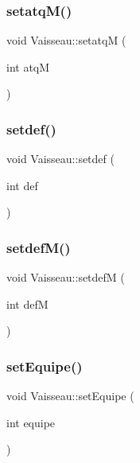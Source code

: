 \mbox{\label{class_vaisseau_ac1eaf0b717e81471f259ce94ad0afb20}} 
\subsubsection{\texorpdfstring{setatq\+M()}{setatqM()}}
{\footnotesize\ttfamily void Vaisseau\+::setatqM (\begin{DoxyParamCaption}\item[{int}]{atqM }\end{DoxyParamCaption})}

\mbox{\label{class_vaisseau_aa6a93a1d1bfd8f7bac3e079fff6d84fa}} 
\subsubsection{\texorpdfstring{setdef()}{setdef()}}
{\footnotesize\ttfamily void Vaisseau\+::setdef (\begin{DoxyParamCaption}\item[{int}]{def }\end{DoxyParamCaption})}

\mbox{\label{class_vaisseau_a4120a8c40229b8af08590ee3a6d00f6a}} 
\subsubsection{\texorpdfstring{setdef\+M()}{setdefM()}}
{\footnotesize\ttfamily void Vaisseau\+::setdefM (\begin{DoxyParamCaption}\item[{int}]{defM }\end{DoxyParamCaption})}

\mbox{\label{class_vaisseau_a1b3edda1f99d55cb5c0c7cbafe156af6}} 
\subsubsection{\texorpdfstring{set\+Equipe()}{setEquipe()}}
{\footnotesize\ttfamily void Vaisseau\+::set\+Equipe (\begin{DoxyParamCaption}\item[{int}]{equipe }\end{DoxyParamCaption})}

